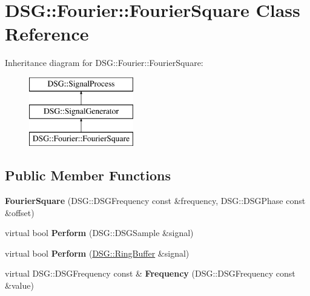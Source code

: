 \hypertarget{class_d_s_g_1_1_fourier_1_1_fourier_square}{\section{D\+S\+G\+:\+:Fourier\+:\+:Fourier\+Square Class Reference}
\label{class_d_s_g_1_1_fourier_1_1_fourier_square}
}
Inheritance diagram for D\+S\+G\+:\+:Fourier\+:\+:Fourier\+Square\+:\begin{figure}[H]
\begin{center}
\leavevmode
\includegraphics[height=3.000000cm]{class_d_s_g_1_1_fourier_1_1_fourier_square}
\end{center}
\end{figure}
\subsection*{Public Member Functions}
\begin{DoxyCompactItemize}
\item 
\hypertarget{class_d_s_g_1_1_fourier_1_1_fourier_square_a277316295ca15354a6e507a71cb5f0db}{{\bfseries Fourier\+Square} (D\+S\+G\+::\+D\+S\+G\+Frequency const \&frequency, D\+S\+G\+::\+D\+S\+G\+Phase const \&offset)}\label{class_d_s_g_1_1_fourier_1_1_fourier_square_a277316295ca15354a6e507a71cb5f0db}

\item 
\hypertarget{class_d_s_g_1_1_fourier_1_1_fourier_square_a05bd0cd3e76ca22e1cede5afb47fbbc4}{virtual bool {\bfseries Perform} (D\+S\+G\+::\+D\+S\+G\+Sample \&signal)}\label{class_d_s_g_1_1_fourier_1_1_fourier_square_a05bd0cd3e76ca22e1cede5afb47fbbc4}

\item 
\hypertarget{class_d_s_g_1_1_fourier_1_1_fourier_square_a46028a3615f26876f9c613f983141362}{virtual bool {\bfseries Perform} (\hyperlink{class_d_s_g_1_1_ring_buffer}{D\+S\+G\+::\+Ring\+Buffer} \&signal)}\label{class_d_s_g_1_1_fourier_1_1_fourier_square_a46028a3615f26876f9c613f983141362}

\item 
\hypertarget{class_d_s_g_1_1_fourier_1_1_fourier_square_a120cbb563a518c9412190eaa36cb269f}{virtual D\+S\+G\+::\+D\+S\+G\+Frequency const \& {\bfseries Frequency} (D\+S\+G\+::\+D\+S\+G\+Frequency const \&value)}\label{class_d_s_g_1_1_fourier_1_1_fourier_square_a120cbb563a518c9412190eaa36cb269f}

\end{DoxyCompactItemize}
